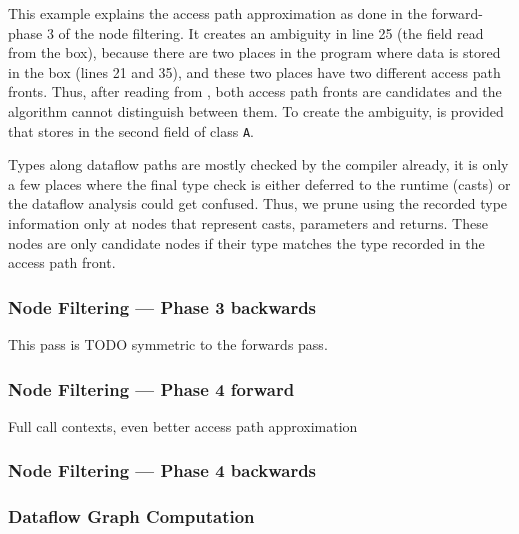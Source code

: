 This example explains the access path approximation as done in the forward-phase 
3 of the node filtering.
It creates an ambiguity in line 25 (the field read from the box),
because there are two places in the program where data is stored in the box 
(lines 21 and 35), and these two places have two different access path fronts.
Thus, after reading from , both access path fronts are candidates 
and the algorithm cannot distinguish between them.
To create the ambiguity,  is provided that stores 
in the second field of class \texttt{A}.

Types along dataflow paths are mostly checked by the compiler already, it is 
only a few places where the final type check is either deferred to the runtime 
(casts) or the dataflow analysis could get confused.
Thus, we prune using the recorded type information only at nodes that represent 
casts, parameters and returns.
These nodes are only candidate nodes if their type 
matches the type recorded in the access path front.

\subsubsection*{Node Filtering --- Phase 3 backwards}
This pass is TODO symmetric to the forwards pass.
\subsubsection*{Node Filtering --- Phase 4 forward}
Full call contexts, even better access path approximation 
\subsubsection*{Node Filtering --- Phase 4 backwards}

\subsubsection*{Dataflow Graph Computation}



